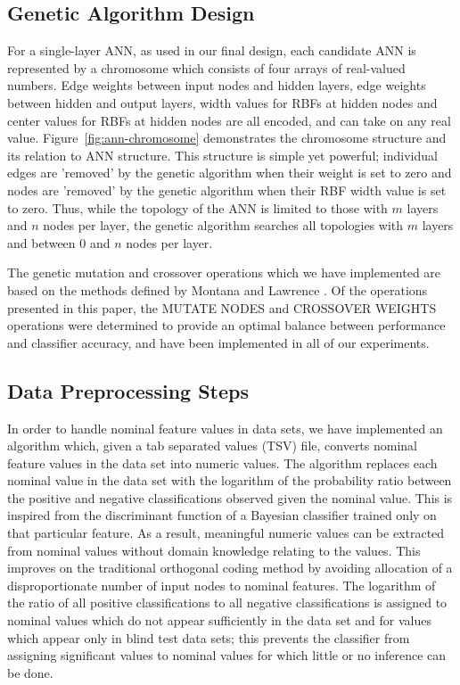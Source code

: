 \documentclass[letterpaper]{jpconf}       %
\begin{document}
\subsection{Genetic Algorithm Design} \label{ann}

For a single-layer ANN, as used in our final design, each candidate ANN is represented by a chromosome which consists of four arrays of real-valued numbers. Edge weights between input nodes and hidden layers, edge weights between hidden and output layers, width values for RBFs at hidden nodes and center values for RBFs at hidden nodes are all encoded, and can take on any real value. Figure~\ref{fig:ann-chromosome} demonstrates the chromosome structure and its relation to ANN structure.  This structure is simple yet powerful; individual edges are 'removed' by the genetic algorithm when their weight is set to zero and nodes are 'removed' by the genetic algorithm when their RBF width value is set to zero.  Thus, while the topology of the ANN is limited to those with $m$ layers and $n$ nodes per layer, the genetic algorithm searches all topologies with $m$ layers and between 0 and $n$ nodes per layer.

The genetic mutation and crossover operations which we have implemented are based on the methods defined by Montana and Lawrence \cite{GA-ANN}. Of the operations presented in this paper, the MUTATE NODES and CROSSOVER WEIGHTS operations were determined to provide an optimal balance between performance and classifier accuracy, and have been implemented in all of our experiments.

\subsection{Data Preprocessing Steps} \label{preprocessing}
In order to handle nominal feature values in data sets, we have implemented an algorithm which, given a tab separated values (TSV) file, converts nominal feature values in the data set into numeric values.  The algorithm replaces each nominal value in the data set with the logarithm of the probability ratio between the positive and negative classifications observed given the nominal value.  This is inspired from the discriminant function of a Bayesian classifier trained only on that particular feature. As a result, meaningful numeric values can be extracted from nominal values without domain knowledge relating to the values. This improves on the traditional orthogonal coding method \cite[slide 17]{MLP-NominalCoding} by avoiding allocation of a disproportionate number of input nodes to nominal features.  The logarithm of the ratio of all positive classifications to all negative classifications is assigned to nominal values which do not appear sufficiently in the data set and for values which appear only in blind test data sets; this prevents the classifier from assigning significant values to nominal values for which little or no inference can be done.
\end{document}
